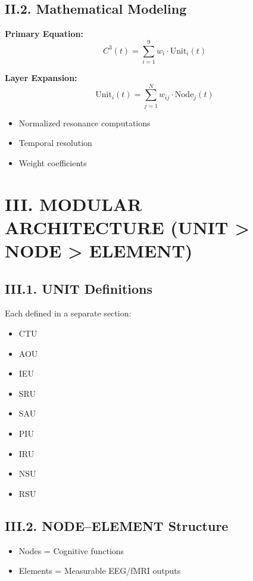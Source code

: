 \documentclass[10pt]{article}
\begin{document}
\subsection*{II.2. Mathematical Modeling}

\textbf{Primary Equation:}
\[
C^3(t) = \sum_{i=1}^{9} w_i \cdot \text{Unit}_i(t)
\]

\textbf{Layer Expansion:}
\[
\text{Unit}_i(t) = \sum_{j=1}^{N} w_{ij} \cdot \text{Node}_j(t)
\]

\begin{itemize}
    \item Normalized resonance computations
    \item Temporal resolution
    \item Weight coefficients
\end{itemize}

\section*{III. MODULAR ARCHITECTURE (UNIT > NODE > ELEMENT)}

\subsection*{III.1. UNIT Definitions}

Each defined in a separate section:

\begin{itemize}
    \item  CTU
    \item  AOU
    \item  IEU
    \item  SRU
    \item  SAU
    \item  PIU
    \item  IRU
    \item  NSU
    \item  RSU
\end{itemize}

\subsection*{III.2. NODE–ELEMENT Structure}

\begin{itemize}
    \item Nodes = Cognitive functions
    \item Elements = Measurable EEG/fMRI outputs
\end{itemize}
\end{document}
